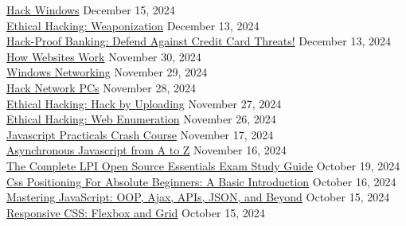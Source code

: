 \documentclass[10pt]{res} %
\begin{document}
\begin{resume}
\href{https://www.udemy.com/certificate/UC-a231b5b1-0bd2-425e-9b8f-d738aec633df}{\color{blue}Hack Windows} \hfill December 15, 2024 \\
\href{https://www.udemy.com/certificate/UC-f02cd2c7-4ca7-4697-a13f-2d49b901f621}{\color{blue}Ethical Hacking: Weaponization} \hfill December 13, 2024 \\
\href{https://www.udemy.com/certificate/UC-7e3df678-d34a-4469-a5f3-e3a3cae7d64c}{\color{blue}Hack-Proof Banking: Defend Against Credit Card Threats!} \hfill December 13, 2024 \\
\href{https://www.udemy.com/certificate/UC-40cb3e60-139b-47a8-8351-6f3a0a455f02}{\color{blue}How Websites Work} \hfill November 30, 2024 \\
\href{https://www.udemy.com/certificate/UC-80ee2128-0366-484e-a58a-9b5ecdeac763}{\color{blue}Windows Networking} \hfill November 29, 2024 \\
\href{https://www.udemy.com/certificate/UC-a9921389-671f-491d-8a1e-fbc6ec5ae10b}{\color{blue}Hack Network PCs} \hfill November 28, 2024 \\
\href{https://www.udemy.com/certificate/UC-7fd0a628-6b1e-462f-b85d-58be797922bb}{\color{blue}Ethical Hacking: Hack by Uploading} \hfill November 27, 2024 \\
\href{https://www.udemy.com/certificate/UC-d022c2ca-4f2b-4c07-9d9b-ba4650c02052}{\color{blue}Ethical Hacking: Web Enumeration} \hfill November 26, 2024 \\
\href{https://www.udemy.com/certificate/UC-20d6215f-e109-4fab-955a-b3142d57da87}{\color{blue}Javascript Practicals Crash Course} \hfill November 17, 2024 \\
\href{https://www.udemy.com/certificate/UC-c3f7b078-f943-4f4f-b52f-7cfa9f8871c1}{\color{blue}Asynchronous Javascript from A to Z} \hfill November 16, 2024 \\
\href{https://www.udemy.com/certificate/UC-29bae963-b31b-4eab-8289-b988a77ec506}{\color{blue}The Complete LPI Open Source Essentials Exam Study Guide} \hfill October 19, 2024 \\
\href{https://www.udemy.com/certificate/UC-96c10f1b-491b-4458-b60d-d87f70a71b2b}{\color{blue}Css Positioning For Absolute Beginners: A Basic Introduction} \hfill October 16, 2024 \\
\href{https://www.udemy.com/certificate/UC-c19c6936-8c9d-491f-a00b-b91037279ce3}{\color{blue}Mastering JavaScript: OOP, Ajax, APIs, JSON, and Beyond} \hfill October 15, 2024 \\
\href{https://www.udemy.com/certificate/UC-dcee4e8e-2860-4789-a1da-dd3cf4480907}{\color{blue}Responsive CSS: Flexbox and Grid} \hfill October 15, 2024 \\

\end{resume}
\end{document}
